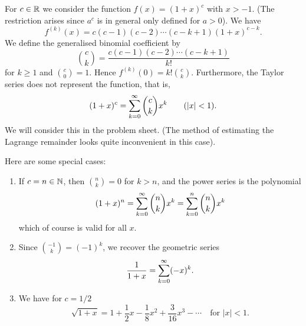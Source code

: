 \documentclass[10pt, a4paper]{article}
\begin{document}
\begin{example}
    For $c \in \mathbb{R}$ we consider the function $f(x) = (1 + x) ^ c$ with $x > -1$.
    (The restriction arises since $a ^ c$ is in general only defined for $a > 0$).
    We have
    \[
    f ^ {(k)}(x) = c(c - 1)(c - 2)\dotsi(c - k + 1)(1 + x) ^ {c - k}.
    \]
    We define the generalised binomial coefficient by
    \[
    \binom{c}{k} = \frac{c(c - 1)(c - 2)\dotsi(c - k + 1)}{k!}
    \]
    for $k \geq 1$ and $\binom{c}{0} = 1$.
    Hence $f ^ {(k)}(0) = k!\binom{c}{k}$.
    Furthermore,
    the Taylor series does not represent the function,
    that is,
    \[
    (1 + x) ^ c = \sum_{k = 0}^{\infty}\binom{c}{k}x ^ k\qquad(|x| < 1).
    \]
    We will consider this in the problem sheet.
    (The method of estimating the Lagrange remainder looks quite inconvenient in this case).

    Here are some special cases:
    \begin{enumerate}[label = (\roman*)]
        \item If $c = n \in \mathbb{N}$,
        then $\binom{n}{k} = 0$ for $k > n$,
        and the power series is the polynomial
        \[
        (1 + x) ^ n = \sum_{k = 0}^{\infty}\binom{n}{k}x ^ k = \sum_{k = 0}^{n}\binom{n}{k}x ^ k
        \]
        which of course is valid for all $x$.
        
        \item Since $\binom{-1}{k} = (-1) ^ k$,
        we recover the geometric series
        \[
        \frac{1}{1 + x} = \sum_{k = 0}^{\infty}(-x) ^ k.
        \]

        \item We have for $c = 1 / 2$
        \[
        \sqrt{1 + x} = 1 + \frac{1}{2}x - \frac{1}{8}x ^ 2 + \frac{3}{16}x ^ 3 - \dotsi\quad\text{for } |x| < 1.
        \]
    \end{enumerate}
\end{example}
\end{document}
